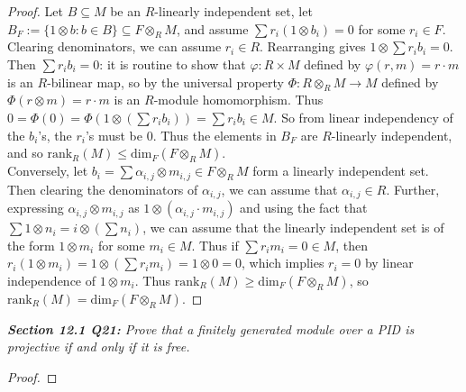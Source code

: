 \documentclass{article}
\begin{document}
  \begin{proof}
    Let $B\subseteq M$ be an $R$-linearly independent set, let
    $B_F:=\{1\otimes b:b\in B\} \subseteq F\otimes_RM$, and assume $\sum
    r_i(1\otimes b_i)=0$ for some $r_i\in F$. Clearing denominators, we can
    assume $r_i\in R$. Rearranging gives $1\otimes\sum r_ib_i=0$. Then
    $\sum r_ib_i=0$: it is routine to show that $\varphi:R\times M$ defined
    by $\varphi(r,m)=r\cdot m$ is an $R$-bilinear map, so by the universal
    property $\Phi:R\otimes_RM\rightarrow M$ defined by $\Phi(r\otimes
    m)=r\cdot m$ is an $R$-module homomorphism. Thus $0=\Phi(0)
    =\Phi(1\otimes(\sum r_ib_i)) =\sum r_ib_i\in M$. So from linear
    independency of the $b_i$'s, the $r_i$'s must be 0. Thus the elements
    in $B_F$ are $R$-linearly independent, and so
    $\text{rank}_R(M)\leq\text{dim}_F(F\otimes_RM)$. \\

    Conversely, let $b_i=\sum \alpha_{i,j}\otimes m_{i,j}\in F\otimes_RM$
    form a linearly independent set. Then clearing the denominators of
    $\alpha_{i,j}$, we can assume that $\alpha_{i,j}\in R$.  Further,
    expressing $\alpha_{i,j}\otimes m_{i,j}$ as $1\otimes(\alpha_{i,j}\cdot
    m_{i,j})$ and using the fact that $\sum 1\otimes n_i=i\otimes(\sum
    n_i)$, we can assume that the linearly independent set is of the form
    $1\otimes m_i$ for some $m_i\in M$. Thus if $\sum r_im_i=0\in M$, then
    $r_i(1\otimes m_i)=1\otimes(\sum r_im_i)=1\otimes0=0$, which implies
    $r_i=0$ by linear independence of $1\otimes m_i$. Thus
    $\text{rank}_R(M)\geq\text{dim}_F(F\otimes_RM)$, so $\text{rank}_R(M)
    =\text{dim}_F(F\otimes_RM)$.
  \end{proof}

\it \textbf{Section 12.1 Q21:} Prove that a finitely generated module over
  a PID is projective if and only if it is free.

  \begin{proof}
  \end{proof}
\end{document}
